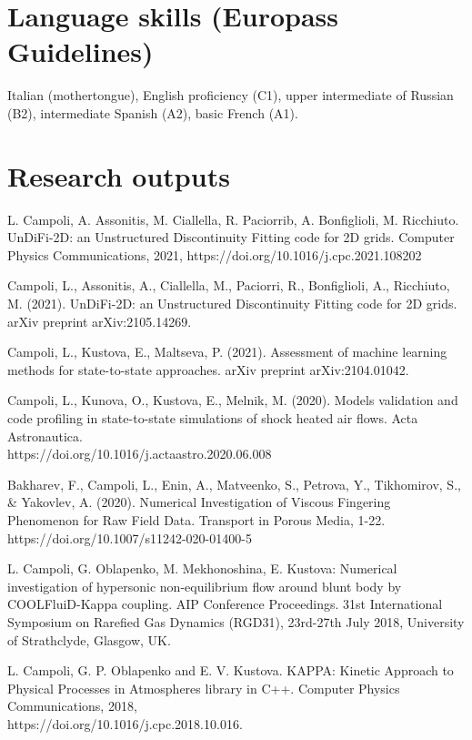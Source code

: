\documentclass[11pt]{res} %
\begin{document}
\begin{resume}
\section{{Language skills} (Europass Guidelines)}
Italian (mothertongue), English proficiency (C1), upper intermediate of Russian (B2), intermediate Spanish (A2), basic French (A1).


\section{{Research outputs}}
L. Campoli, A. Assonitis, M. Ciallella, R. Paciorrib, A. Bonfiglioli, M. Ricchiuto. UnDiFi-2D: an Unstructured Discontinuity Fitting code for 2D grids. Computer Physics Communications, 2021, https://doi.org/10.1016/j.cpc.2021.108202

Campoli, L., Assonitis, A., Ciallella, M., Paciorri, R., Bonfiglioli, A.,  Ricchiuto, M. (2021). UnDiFi-2D: an Unstructured Discontinuity Fitting code for 2D grids. arXiv preprint arXiv:2105.14269.

Campoli, L., Kustova, E., Maltseva, P. (2021). Assessment of machine learning methods for state-to-state approaches. arXiv preprint arXiv:2104.01042.

Campoli, L., Kunova, O., Kustova, E., Melnik, M. (2020). Models validation and code profiling in state-to-state simulations of shock heated air flows. Acta Astronautica. \\
https://doi.org/10.1016/j.actaastro.2020.06.008

Bakharev, F., Campoli, L., Enin, A., Matveenko, S., Petrova, Y., Tikhomirov, S., \& Yakovlev, A. (2020). Numerical Investigation of Viscous Fingering Phenomenon for Raw Field Data. Transport in Porous Media, 1-22. https://doi.org/10.1007/s11242-020-01400-5

L. Campoli, G. Oblapenko, M. Mekhonoshina, E. Kustova: Numerical investigation of hypersonic
non-equilibrium flow around blunt body by COOLFluiD-Kappa coupling. AIP Conference
Proceedings. 31st International Symposium on Rarefied Gas Dynamics (RGD31), 23rd-27th July
2018, University of Strathclyde, Glasgow, UK.

L. Campoli, G. P. Oblapenko and E. V. Kustova. KAPPA: Kinetic Approach to Physical Processes
in Atmospheres library in C++. Computer Physics Communications, 2018, \\ https://doi.org/10.1016/j.cpc.2018.10.016.


\end{resume}
\end{document}
